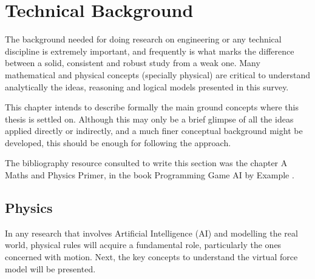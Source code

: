 \ifx\isEmbedded\undefined

\graphicspath{{../img/}}

\fi

\chapter{Technical Background}
\label{chap:technical_background}

The background needed for doing research on engineering or any technical discipline is extremely important, and frequently is what marks the difference between a solid, consistent and robust study from a weak one. Many mathematical and physical concepts (specially physical) are critical to understand analytically the ideas, reasoning and logical models presented in this survey.

This chapter intends to describe formally the main ground concepts where this thesis is settled on. Although this may only be a brief glimpse of all the ideas applied directly or indirectly, and a much finer conceptual background might be developed, this should be enough for following the approach.

The bibliography resource consulted to write this section was the chapter A Maths and Physics Primer, in the book Programming Game AI by Example \citep{buckland}.

\section{Physics}

In any research that involves Artificial Intelligence (AI) and modelling the real world, physical rules will acquire a fundamental role, particularly the ones concerned with motion. Next, the key concepts to understand the virtual force model will be presented.

